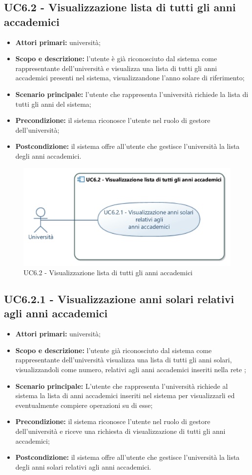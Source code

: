 \documentclass[AnalisiDeiRequisiti.tex]{subfiles}
\begin{document}
\subsection{UC6.2 - Visualizzazione lista di tutti gli anni accademici}
\begin{itemize}
	\item \textbf{Attori primari:} università;
	\item \textbf{Scopo e descrizione:} l'utente è già riconosciuto dal sistema come rappresentante dell'università e visualizza una lista di tutti gli anni accademici presenti nel sistema, visualizzandone l'anno solare di riferimento;
	\item \textbf{Scenario principale:} l'utente che rappresenta l'università richiede la lista di tutti gli anni del sistema;
	\item \textbf{Precondizione:} il sistema riconosce l'utente nel ruolo di gestore dell'università;
	\item \textbf{Postcondizione:} il sistema offre all'utente che gestisce l'università la lista degli anni accademici.
\end{itemize}
\begin{figure}[H]
	\centering
	\includegraphics[width=0.7\linewidth]{UC6_2.jpg}
	\caption{UC6.2 - Visualizzazione lista di tutti gli anni accademici}
	\label{fig:UC6.2 - Visualizzazione lista di tutti gli anni accademici}
\end{figure}
\subsection{UC6.2.1 - Visualizzazione anni solari relativi agli anni accademici}
\begin{itemize}
	\item \textbf{Attori primari:} università;
	\item \textbf{Scopo e descrizione:} l'utente già riconosciuto dal sistema come rappresentante dell'università visualizza una lista di tutti gli anni solari, visualizzandoli come numero, relativi agli anni accademici inseriti nella rete ;
	\item \textbf{Scenario principale:} L'utente che rappresenta l'università richiede al sistema la lista di anni accademici inseriti nel sistema per visualizzarli ed eventualmente compiere operazioni su di esse;
	\item \textbf{Precondizione:} il sistema riconosce l'utente nel ruolo di gestore dell'università e riceve una richiesta di visualizzazione di tutti gli anni accademici;
	\item \textbf{Postcondizione:} il sistema offre all'utente che gestisce l'università la lista degli anni solari relativi agli anni accademici.
\end{itemize}
\end{document}
